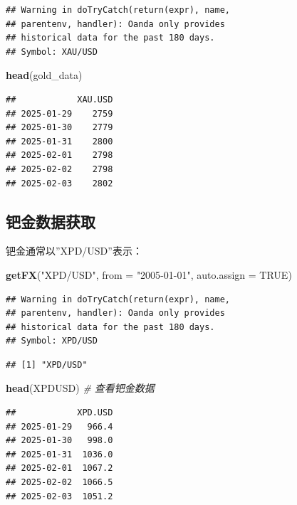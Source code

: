 \documentclass[]{ctexbook}
\newenvironment{Shaded}{\begin{snugshade}}{\end{snugshade}}
\newcommand{\AttributeTok}[1]{\textcolor[rgb]{0.13,0.29,0.53}{#1}}
\newcommand{\CommentTok}[1]{\textcolor[rgb]{0.56,0.35,0.01}{\textit{#1}}}
\newcommand{\ConstantTok}[1]{\textcolor[rgb]{0.56,0.35,0.01}{#1}}
\newcommand{\FunctionTok}[1]{\textcolor[rgb]{0.13,0.29,0.53}{\textbf{#1}}}
\newcommand{\NormalTok}[1]{#1}
\newcommand{\StringTok}[1]{\textcolor[rgb]{0.31,0.60,0.02}{#1}}
\begin{document}
\begin{verbatim}
## Warning in doTryCatch(return(expr), name,
## parentenv, handler): Oanda only provides
## historical data for the past 180 days.
## Symbol: XAU/USD
\end{verbatim}

\begin{Shaded}
\begin{Highlighting}[]
\FunctionTok{head}\NormalTok{(gold\_data)}
\end{Highlighting}
\end{Shaded}

\begin{verbatim}
##            XAU.USD
## 2025-01-29    2759
## 2025-01-30    2779
## 2025-01-31    2800
## 2025-02-01    2798
## 2025-02-02    2798
## 2025-02-03    2802
\end{verbatim}

\subsection{钯金数据获取}\label{ux94afux91d1ux6570ux636eux83b7ux53d6}

钯金通常以''XPD/USD''表示：

\begin{Shaded}
\begin{Highlighting}[]
\FunctionTok{getFX}\NormalTok{(}\StringTok{"XPD/USD"}\NormalTok{, }\AttributeTok{from =} \StringTok{"2005{-}01{-}01"}\NormalTok{, }\AttributeTok{auto.assign =} \ConstantTok{TRUE}\NormalTok{)}
\end{Highlighting}
\end{Shaded}

\begin{verbatim}
## Warning in doTryCatch(return(expr), name,
## parentenv, handler): Oanda only provides
## historical data for the past 180 days.
## Symbol: XPD/USD
\end{verbatim}

\begin{verbatim}
## [1] "XPD/USD"
\end{verbatim}

\begin{Shaded}
\begin{Highlighting}[]
\FunctionTok{head}\NormalTok{(XPDUSD)  }\CommentTok{\# 查看钯金数据}
\end{Highlighting}
\end{Shaded}

\begin{verbatim}
##            XPD.USD
## 2025-01-29   966.4
## 2025-01-30   998.0
## 2025-01-31  1036.0
## 2025-02-01  1067.2
## 2025-02-02  1066.5
## 2025-02-03  1051.2
\end{verbatim}
\end{document}
